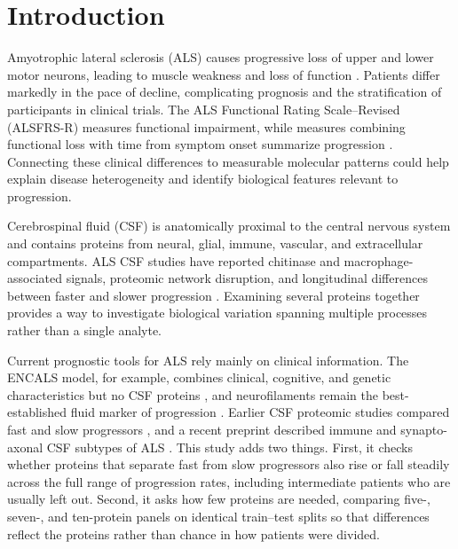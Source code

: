 \documentclass[11pt,letterpaper]{article}
\begin{document}
\section{Introduction}

Amyotrophic lateral sclerosis (ALS) causes progressive loss of upper and lower motor neurons, leading to muscle weakness and loss of function \citep{hardiman2017}. Patients differ markedly in the pace of decline, complicating prognosis and the stratification of participants in clinical trials. The ALS Functional Rating Scale--Revised (ALSFRS-R) measures functional impairment, while measures combining functional loss with time from symptom onset summarize progression \citep{cedarbaum1999,kimura2006}. Connecting these clinical differences to measurable molecular patterns could help explain disease heterogeneity and identify biological features relevant to progression.

Cerebrospinal fluid (CSF) is anatomically proximal to the central nervous system and contains proteins from neural, glial, immune, vascular, and extracellular compartments. ALS CSF studies have reported chitinase and macrophage-associated signals, proteomic network disruption, and longitudinal differences between faster and slower progression \citep{thompson2018,thompson2019,thompson2021,vu2023,dellar2024}. Examining several proteins together provides a way to investigate biological variation spanning multiple processes rather than a single analyte.

Current prognostic tools for ALS rely mainly on clinical information. The ENCALS model, for example, combines clinical, cognitive, and genetic characteristics but no CSF proteins \citep{westeneng2018}, and neurofilaments remain the best-established fluid marker of progression \citep{lu2015,benatar2020,boylan2013}. Earlier CSF proteomic studies compared fast and slow progressors \citep{thompson2021,vu2023}, and a recent preprint described immune and synapto-axonal CSF subtypes of ALS \citep{tzeplaeff2026}. This study adds two things. First, it checks whether proteins that separate fast from slow progressors also rise or fall steadily across the full range of progression rates, including intermediate patients who are usually left out. Second, it asks how few proteins are needed, comparing five-, seven-, and ten-protein panels on identical train--test splits so that differences reflect the proteins rather than chance in how patients were divided.
\end{document}
